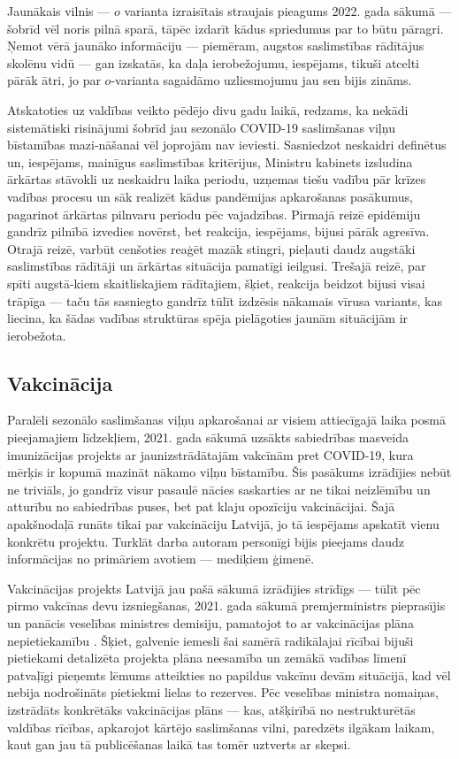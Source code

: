 \documentclass[12pt, a4paper]{article}
\numberwithin{equation}{section} %
\begin{document}
Jaunākais vilnis --- $o$ varianta izraisītais straujais pieagums 2022. gada sākumā --- šobrīd vēl noris pilnā sparā, tāpēc izdarīt kādus spriedumus par to būtu pāragri. Ņemot vērā jaunāko informāciju --- piemēram, augstos saslimstības rādītājus skolēnu vidū \cite{lv_sick_student} --- gan izskatās, ka daļa ierobežojumu, iespējams, tikuši atcelti pārāk ātri, jo par $o$-varianta sagaidāmo uzliesmojumu jau sen bijis zināms.

Atskatoties uz valdības veikto pēdējo divu gadu laikā, redzams, ka nekādi sistemātiski risinājumi šobrīd jau sezonālo COVID-19 saslimšanas viļņu bīstamības mazi-nāšanai vēl joprojām nav ieviesti. Sasniedzot neskaidri definētus un, iespējams, mainīgus saslimstības kritērijus, Ministru kabinets izsludina ārkārtas stāvokli uz neskaidru laika periodu, uzņemas tiešu vadību pār krīzes vadības procesu un sāk realizēt kādus pandēmijas apkarošanas pasākumus, pagarinot ārkārtas pilnvaru periodu pēc vajadzības. Pirmajā reizē epidēmiju gandrīz pilnībā izvedies novērst, bet reakcija, iespējams, bijusi pārāk agresīva. Otrajā reizē, varbūt cenšoties reaģēt mazāk stingri, pieļauti daudz augstāki saslimstības rādītāji un ārkārtas situācija pamatīgi ieilgusi. Trešajā reizē, par spīti augstā-kiem skaitliskajiem rādītajiem, šķiet, reakcija beidzot bijusi visai trāpīga --- taču tās sasniegto gandrīz tūlīt izdzēsis nākamais vīrusa variants, kas liecina, ka šādas vadības struktūras spēja pielāgoties jaunām situācijām ir ierobežota.

\subsection{Vakcinācija}

Paralēli sezonālo saslimšanas viļņu apkarošanai ar visiem attiecīgajā laika posmā pieejamajiem līdzekļiem, 2021. gada sākumā uzsākts sabiedrības masveida imunizācijas projekts ar jaunizstrādātajām vakcīnām pret COVID-19, kura mērķis ir kopumā mazināt nākamo viļņu bīstamību. Šis pasākums izrādījies nebūt ne triviāls, jo gandrīz visur pasaulē nācies saskarties ar ne tikai neizlēmību un atturību no sabiedrības puses, bet pat klaju opozīciju vakcinācijai. Šajā apakšnodaļā runāts tikai par vakcināciju Latvijā, jo tā iespējams apskatīt vienu konkrētu projektu. Turklāt darba autoram personīgi bijis pieejams daudz informācijas no primāriem avotiem --- mediķiem ģimenē.

Vakcinācijas projekts Latvijā jau pašā sākumā izrādījies strīdīgs --- tūlīt pēc pirmo vakcīnas devu izsniegšanas, 2021. gada sākumā premjerministrs pieprasījis un panācis veselības ministres demisiju, pamatojot to ar vakcinācijas plāna nepietiekamību \cite{lv_minister_fired}. Šķiet, galvenie iemesli šai samērā radikālajai rīcībai bijuši pietiekami detalizēta projekta plāna neesamība un zemākā vadības līmenī patvaļīgi pieņemts lēmums atteikties no papildus vakcīnu devām situācijā, kad vēl nebija nodrošināts pietiekmi lielas to rezerves. Pēc veselības ministra nomaiņas, izstrādāts konkrētāks vakcinācijas plāns \cite{lv_vaxx_plan} --- kas, atšķirībā no nestrukturētās valdības rīcības, apkarojot kārtējo saslimšanas vilni, paredzēts ilgākam laikam, kaut gan jau tā publicēšanas laikā tas tomēr uztverts ar skepsi. 
\end{document}
